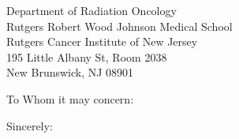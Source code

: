 \documentclass[
    jphafner,
    subject=titled,  %
    backaddress=false,
]{scrlttr2}
\date{\today}
\begin{document}
\begin{letter}{%
Department of Radiation Oncology \\
Rutgers Robert Wood Johnson Medical School \\
Rutgers Cancer Institute of New Jersey \\
195 Little Albany St, Room 2038 \\
New Brunswick, NJ 08901 \\

}
\opening{To Whom it may concern:}


\closing{Sincerely:}
\end{letter}
\end{document}
